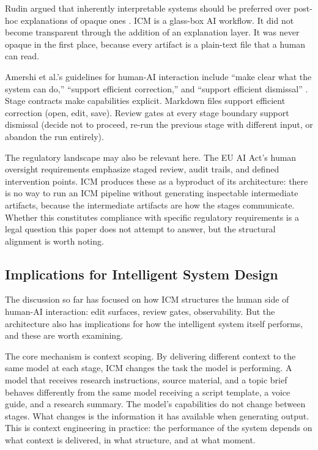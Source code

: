 \documentclass[acmlarge,nonacm,screen]{acmart}
\begin{document}
Rudin argued that inherently interpretable systems should be preferred over post-hoc explanations of opaque ones \cite{rudin2019}. ICM is a glass-box AI workflow. It did not become transparent through the addition of an explanation layer. It was never opaque in the first place, because every artifact is a plain-text file that a human can read.

Amershi et al.'s guidelines for human-AI interaction include ``make clear what the system can do,'' ``support efficient correction,'' and ``support efficient dismissal'' \cite{amershi2019}. Stage contracts make capabilities explicit. Markdown files support efficient correction (open, edit, save). Review gates at every stage boundary support dismissal (decide not to proceed, re-run the previous stage with different input, or abandon the run entirely).

The regulatory landscape may also be relevant here. The EU AI Act's human oversight requirements \cite{enqvist2023, novelli2024} emphasize staged review, audit trails, and defined intervention points. ICM produces these as a byproduct of its architecture: there is no way to run an ICM pipeline without generating inspectable intermediate artifacts, because the intermediate artifacts are how the stages communicate. Whether this constitutes compliance with specific regulatory requirements is a legal question this paper does not attempt to answer, but the structural alignment is worth noting.

\subsection{Implications for Intelligent System Design}

The discussion so far has focused on how ICM structures the human side of human-AI interaction: edit surfaces, review gates, observability. But the architecture also has implications for how the intelligent system itself performs, and these are worth examining.

The core mechanism is context scoping. By delivering different context to the same model at each stage, ICM changes the task the model is performing. A model that receives research instructions, source material, and a topic brief behaves differently from the same model receiving a script template, a voice guide, and a research summary. The model's capabilities do not change between stages. What changes is the information it has available when generating output. This is context engineering in practice: the performance of the system depends on what context is delivered, in what structure, and at what moment.
\end{document}
